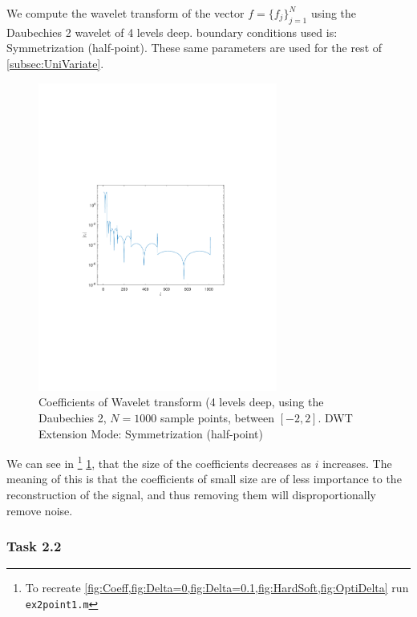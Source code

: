 \documentclass[a4paper]{article}
\begin{document}
    We compute the wavelet transform of the vector $f = \{f_j\}_{j=1}^N$ using the Daubechies 2 wavelet of 4 levels deep. boundary conditions used is: Symmetrization (half-point). These same parameters are used for the rest of \cref{subsec:UniVariate}.
    \begin{figure}[H]
	\centering
	\includegraphics[trim={3.5cm 8cm 4cm 9cm},clip,width=0.7\textwidth]{Images/Coefficents.pdf}
	\caption{Coefficients of Wavelet transform (4 levels deep, using the Daubechies 2, $N=1000$ sample points, between $[-2,2]$. DWT Extension Mode: Symmetrization (half-point)}
	\label{fig:Coeff}
    \end{figure}

    We can see in \footnote{To recreate \cref{fig:Coeff,fig:Delta=0,fig:Delta=0.1,fig:HardSoft,fig:OptiDelta} run \texttt{ex2point1.m}} \cref{fig:Coeff}, that the size of the coefficients decreases as $i$ increases. The meaning of this is that the coefficients of small size are of less importance to the reconstruction of the signal, and thus removing them will disproportionally remove noise.

    \subsubsection{Task 2.2}
\end{document}
